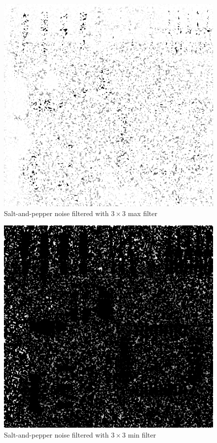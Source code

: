 \documentclass{article}
\begin{document}
\begin{figure}[H]
	\centering
	\includegraphics[width=336pt]{../result/task2/sap/sap-max.png}
	\caption{Salt-and-pepper noise filtered with $3 \times 3$ max filter}
	\label{fig:sapmax}
\end{figure}

\begin{figure}[H]
	\centering
	\includegraphics[width=336pt]{../result/task2/sap/sap-min.png}
	\caption{Salt-and-pepper noise filtered with $3 \times 3$ min filter}
	\label{fig:sapmin}
\end{figure}
\end{document}
